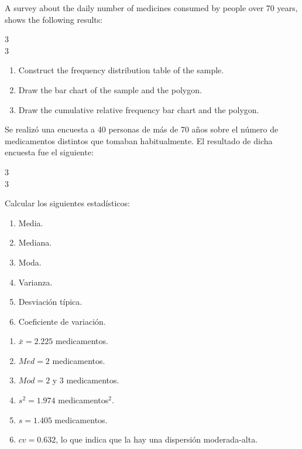 
{A survey about the daily number of medicines consumed by people over 70 years, shows the following results:

\begin{center}
3 \\
3
\end{center}

\begin{enumerate}
\item Construct the frequency distribution table of the sample.
\item Draw the bar chart of the sample and the polygon.
\item Draw the cumulative relative frequency bar chart and the polygon.
\end{enumerate}
}
{
}
{}

{Se realizó una encuesta a 40 personas de más de 70 años sobre el número de medicamentos distintos que tomaban habitualmente. El resultado de dicha encuesta fue el siguiente:
\begin{center}
3 \\
3
\end{center}
Calcular los siguientes estadísticos:
\begin{enumerate}
\item Media.
\item Mediana.
\item Moda.
\item Varianza.
\item Desviación típica.
\item Coeficiente de variación.
\end{enumerate}
}
{\begin{enumerate}
\item $ \bar{x} = 2.225$ medicamentos.
\item $Med =2$ medicamentos.
\item $Mod= 2$ y $3$ medicamentos.
\item $s^2 = 1.974$ medicamentos$^2$.
\item $s= 1.405$ medicamentos.
\item $cv = 0.632$, lo que indica que la hay una dispersión moderada-alta.
\end{enumerate}
}
{}


